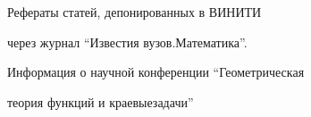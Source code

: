 \medskip







\medskip











\noindent{}Рефераты статей, депонированных в ВИНИТИ


через журнал ``Известия вузов.\newline Математика''.








\medskip





\noindent{}Информация о научной конференции ``Геометрическая


теория функций и краевые\newline задачи'' 




























